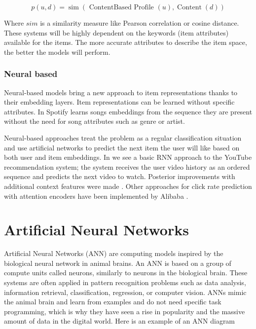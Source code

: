 \documentclass{tex_files/kththesis}
\begin{document}
\begin{equation}
p(u, d)=\operatorname{sim}(\text { ContentBased Profile }(u), \operatorname{Content}(d))
\end{equation}

Where $sim$ is a similarity measure like Pearson correlation or cosine distance.
These systems will be highly dependent on the keywords (item attributes) available for the items. The more accurate attributes to describe the item space, the better the models will perform.

\subsubsection{Neural based}
Neural-based models bring a new approach to item representations \cite{content-embeddings} thanks to their embedding layers. Item representations can be learned without specific attributes. In \cite{spotifyembeddings} Spotify learns songs embeddings from the sequence they are present without the need for song attributes such as genre or artist.

Neural-based approaches treat the problem as a regular classification situation and use artificial networks to predict the next item the user will like based on both user and item embeddings. In \cite{rnn-youtube} we see a basic RNN approach to the YouTube recommendation system; the system receives the user video history as an ordered sequence and predicts the next video to watch. Posterior improvements with additional context features were made \cite{rnn-youtube-improved}. Other approaches for click rate prediction with attention encoders have been implemented by Alibaba \cite{alibaba}.

\section{Artificial Neural Networks}
Artificial Neural Networks (ANN) are computing models inspired by the biological neural network in animal brains. An ANN is based on a group of compute units called neurons, similarly to neurons in the biological brain. These systems are often applied in pattern recognition \cite{pattern-bishop} problems such as data analysis, information retrieval, classification, regression, or computer vision. ANNs mimic the animal brain and learn from examples and do not need specific task programming, which is why they have seen a rise in popularity and the massive amount of data in the digital world. Here is an example of an ANN diagram
\end{document}
